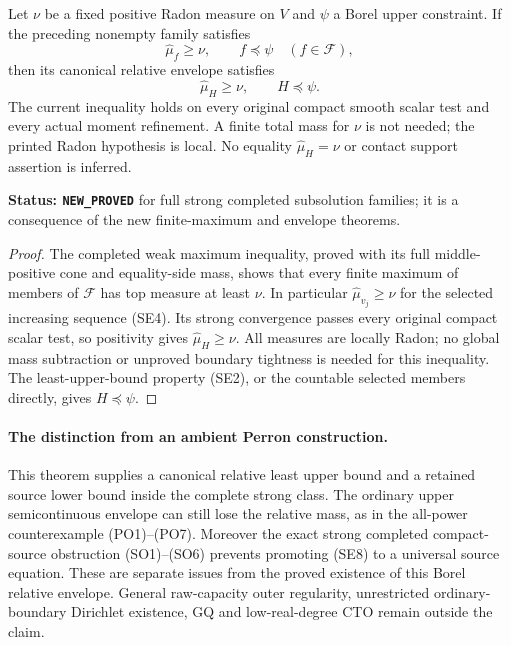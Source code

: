 \begin{corollary}
\label{cor:r11-strong-Perron-subsolution}
Let $\nu$ be a fixed positive Radon measure on $V$ and
$\psi$ a Borel upper constraint. If the preceding nonempty
family satisfies
\[
                    \widehat\mu_f\geq\nu,
                    \qquad f\preceq\psi
                                  \quad(f\in\mathscr F),
 \tag{SE7}
\]
then its canonical relative envelope satisfies
\[
                             \widehat\mu_H\geq\nu,
                             \qquad H\preceq\psi.
 \tag{SE8}
\]
The current inequality holds on every original compact smooth
scalar test and every actual moment refinement. A finite total
mass for $\nu$ is not needed; the printed Radon hypothesis is
local. No equality $\widehat\mu_H=\nu$ or contact support
assertion is inferred.
\end{corollary}

\noindent\textbf{Status: \texttt{NEW\_PROVED}} for full strong
completed subsolution families; it is a consequence of the
new finite-maximum and envelope theorems.

\begin{proof}
The completed weak maximum inequality, proved with its full
middle-positive cone and equality-side mass, shows that every
finite maximum of members of $\mathscr F$ has top measure at
least $\nu$. In particular $\widehat\mu_{v_j}\geq\nu$ for
the selected increasing sequence (SE4).
Its strong convergence passes every original compact scalar
test, so positivity gives $\widehat\mu_H\geq\nu$.
All measures are locally Radon; no global mass subtraction
or unproved boundary tightness is needed for this inequality.
The least-upper-bound property (SE2), or the countable selected
members directly, gives $H\preceq\psi$.
\end{proof}

\paragraph{The distinction from an ambient Perron construction.}
This theorem supplies a canonical relative least upper bound
and a retained source lower bound inside the complete strong
class. The ordinary upper semicontinuous envelope can still
lose the relative mass, as in the all-power counterexample
(PO1)--(PO7). Moreover the exact strong completed compact-source
obstruction (SO1)--(SO6) prevents promoting (SE8) to a universal
source equation. These are separate issues from the proved
existence of this Borel relative envelope. General raw-capacity
outer regularity, unrestricted ordinary-boundary Dirichlet
existence, GQ and low-real-degree CTO remain outside the claim.
